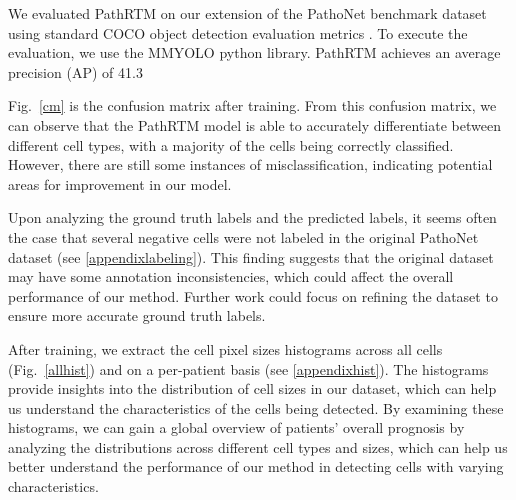 \documentclass[runningheads]{llncs}
\begin{document}
We evaluated PathRTM on our extension of the PathoNet benchmark dataset using standard COCO \cite{lin2014microsoft} object detection evaluation metrics \cite{padilla2021comparative}. To execute the evaluation, we use the MMYOLO \cite{mmyolo2022} python library. PathRTM achieves an average precision (AP) of 41.3%

Fig.~\ref{cm} is the confusion matrix after training. From this confusion matrix, we can observe that the PathRTM model is able to accurately differentiate between different cell types, with a majority of the cells being correctly classified. However, there are still some instances of misclassification, indicating potential areas for improvement in our model.

Upon analyzing the ground truth labels and the predicted labels, it seems often the case that several negative cells were not labeled in the original PathoNet dataset (see \ref{appendixlabeling}). This finding suggests that the original dataset may have some annotation inconsistencies, which could affect the overall performance of our method. Further work could focus on refining the dataset to ensure more accurate ground truth labels.

After training, we extract the cell pixel sizes histograms across all cells (Fig.~\ref{allhist}) and on a per-patient basis (see \ref{appendixhist}). The histograms provide insights into the distribution of cell sizes in our dataset, which can help us understand the characteristics of the cells being detected. By examining these histograms, we can gain a global overview of patients' overall prognosis by analyzing the distributions across different cell types and sizes, which can help us better understand the performance of our method in detecting cells with varying characteristics.
\end{document}

